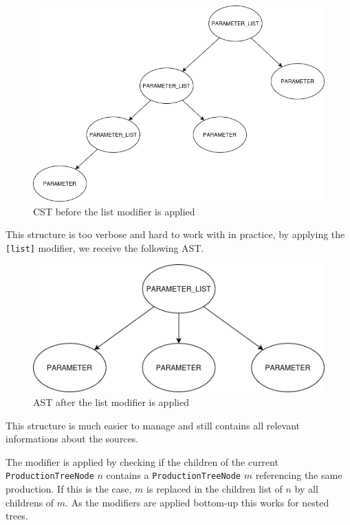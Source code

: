 \begin{figure}[H]
    \centering
    \includegraphics[scale=0.4]{"fig/list_modifier_cst.png"}
    \caption{CST before the list modifier is applied}
\end{figure}

This structure is too verbose and hard to work with in practice, by applying the \verb|[list]| modifier, we receive the following AST.

\begin{figure}[H]
    \centering
    \includegraphics[scale=0.4]{"fig/list_modifier_ast.png"}
    \caption{AST after the list modifier is applied}
\end{figure}

This structure is much easier to manage and still contains all relevant informations about the sources.

The modifier is applied by checking if the children of the current \verb|ProductionTreeNode| $n$ contains a \verb|ProductionTreeNode| $m$ referencing the same production. If this is the case, $m$ is replaced in the children list of $n$ by all childrens of $m$.
As the modifiers are applied bottom-up this works for nested trees.

